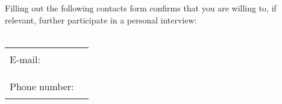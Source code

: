 \begin{mdframed}[linewidth=0pt,backgroundcolor=lightgray!20,innertopmargin = 0.1cm,innerbottommargin = 0.5cm]
    Filling out the following contacts form confirms that you are willing to, if relevant, further participate in a personal interview:\\\\
    \begin{tabular}{ll}
        \quad E-mail: &
        \begin{left}
            \rule{0.46\textwidth}{.4pt}
        \end{left}\\\\
        \quad Phone number: &
        \begin{left}
        \rule{0.46\textwidth}{.4pt}
        \end{left}
    \end{tabular}
\end{mdframed}